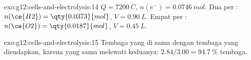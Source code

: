 \begin{solution}{exo:g12:cells-and-electrolysis:14}
$Q = \qty{7200}{C}$, $n(e^-) = \qty{0.0746}{mol}$. Dua  per
: $n(\ce{H2}) = \qty{0.0373}{mol}$, $V = \qty{0.90}{L}$. Empat
per : $n(\ce{O2}) = \qty{0.0187}{mol}$, $V = \qty{0.45}{L}$.
\end{solution}

\begin{solution}{exo:g12:cells-and-electrolysis:15}
Tembaga yang  di  sama dengan tembaga yang diendapkan, karena
 yang sama melewati keduanya: $2.84/3.00 = \qty{94.7}{\percent}$
tembaga.
\end{solution}

